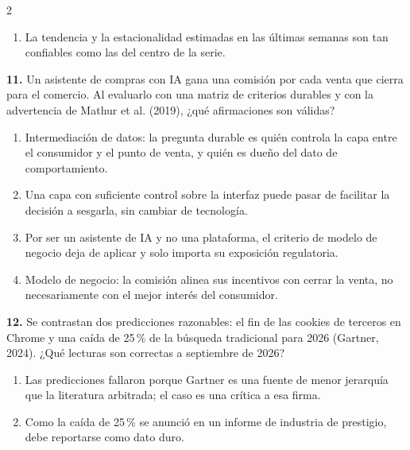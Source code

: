 \documentclass[10pt,letterpaper]{article}
\newcommand{\cas}{\framebox[1.0em]{\rule{0pt}{1.05ex}}}
\begin{document}
\begin{multicols}{2}
\begin{minipage}[t]{\columnwidth}
\begin{enumerate}[label=\cas\ \alph*),leftmargin=2.3em,itemsep=1.2pt,topsep=1pt,parsep=0pt,partopsep=0pt]
\item La tendencia y la estacionalidad estimadas en las últimas semanas son tan confiables como las del centro de la serie.
\end{enumerate}\end{minipage}\par\vspace{3pt}
\begin{minipage}[t]{\columnwidth}\noindent\textbf{11.} Un asistente de compras con IA gana una comisión por cada venta que cierra para el comercio. Al evaluarlo con una matriz de criterios durables y con la advertencia de Mathur et al. (2019), ¿qué afirmaciones son válidas?
\vspace{1pt}\begin{enumerate}[label=\cas\ \alph*),leftmargin=2.3em,itemsep=1.2pt,topsep=1pt,parsep=0pt,partopsep=0pt]
\item Intermediación de datos: la pregunta durable es quién controla la capa entre el consumidor y el punto de venta, y quién es dueño del dato de comportamiento.
\item Una capa con suficiente control sobre la interfaz puede pasar de facilitar la decisión a sesgarla, sin cambiar de tecnología.
\item Por ser un asistente de IA y no una plataforma, el criterio de modelo de negocio deja de aplicar y solo importa su exposición regulatoria.
\item Modelo de negocio: la comisión alinea sus incentivos con cerrar la venta, no necesariamente con el mejor interés del consumidor.
\end{enumerate}\end{minipage}\par\vspace{3pt}
\begin{minipage}[t]{\columnwidth}\noindent\textbf{12.} Se contrastan dos predicciones razonables: el fin de las cookies de terceros en Chrome y una caída de 25\,\% de la búsqueda tradicional para 2026 (Gartner, 2024). ¿Qué lecturas son correctas a septiembre de 2026?
\vspace{1pt}\begin{enumerate}[label=\cas\ \alph*),leftmargin=2.3em,itemsep=1.2pt,topsep=1pt,parsep=0pt,partopsep=0pt]
\item Las predicciones fallaron porque Gartner es una fuente de menor jerarquía que la literatura arbitrada; el caso es una crítica a esa firma.
\item Como la caída de 25\,\% se anunció en un informe de industria de prestigio, debe reportarse como dato duro.

\end{enumerate}
\end{minipage}
\end{multicols}
\end{document}
